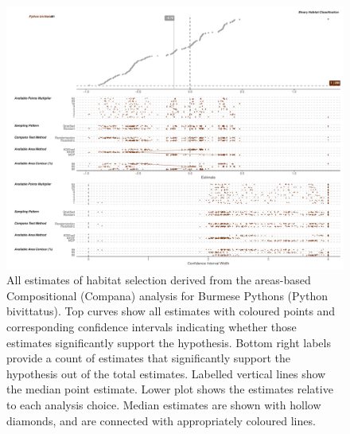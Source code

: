 \documentclass[10pt,a4paper]{article}
\begin{document}
\begin{figure}
\includegraphics[width=1\linewidth]{../../figures/specCurve_Python bivittatus_area} \caption{All estimates of habitat selection derived from the areas-based Compositional (Compana) analysis for Burmese Pythons (Python bivittatus). Top curves show all estimates with coloured points and corresponding confidence intervals indicating whether those estimates significantly support the hypothesis. Bottom right labels provide a count of estimates that significantly support the hypothesis out of the total estimates. Labelled vertical lines show the median point estimate. Lower plot shows the estimates relative to each analysis choice. Median estimates are shown with hollow diamonds, and are connected with appropriately coloured lines.}\label{fig:specCurveAreaPYBI}
\end{figure}
\end{document}
